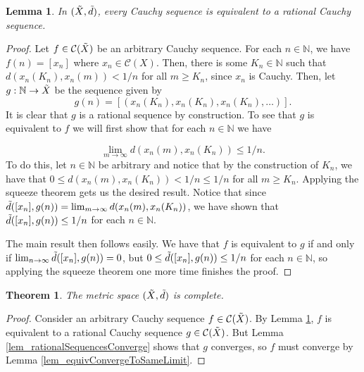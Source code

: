 \documentclass{article}
\newtheorem{theorem}{Theorem}[subsection]
\newtheorem{lemma}{Lemma}[subsection]
\theoremstyle{definition}
\theoremstyle{remark}
\newcommand{\N}{\mathbb{N}}
\newcommand{\prt}[1]{\mathcal{#1}}
\begin{document}
\begin{lemma} \label{lem_cauchySequenceEquivToRationalSequence}
    In $(\Tilde{X}, \Tilde{d})$, every Cauchy sequence is equivalent to a rational Cauchy sequence.
\end{lemma}

\begin{proof}
    Let $f \in \prt{C}(\Tilde{X})$ be an arbitrary Cauchy sequence.
    For each $n \in \N$, we have $f(n) = [x_n]$ where $x_n \in \prt{C}(X)$. Then, there is some $K_n \in \N$ such that $d(x_n(K_n), x_n(m)) < 1/n$ for all $m \geq K_n$, since $x_n$ is Cauchy. Then, let $g: \N \to \Tilde{X}$ be the sequence given by 
    \begin{equation*}
        g(n) = [(x_n(K_n), x_n(K_n), x_n(K_n), \dots)].
    \end{equation*} It is clear that $g$ is a rational sequence by construction. To see that $g$ is equivalent to $f$ we will first show that for each $n \in \N$ we have 
    
    \begin{equation*}
        \lim_{m \to \infty} d(x_n(m), x_n(K_n)) \leq 1/n.
    \end{equation*} To do this, let $n \in \N$ be arbitrary and notice that by the construction of $K_n$, we have that $0 \leq d(x_n(m), x_n(K_n)) < 1/n \leq 1/n$ for all $m \geq K_n$. Applying the squeeze theorem gets us the desired result. Notice that since $\Tilde{d}([x_n], g(n)) = \lim_{m \to \infty} d(x_n(m), x_n(K_n))$, we have shown that $\Tilde{d}([x_n], g(n)) \leq 1/n$ for each $n \in \N$.
    
    The main result then follows easily. We have that $f$ is equivalent to $g$ if and only if $\lim_{n \to \infty} \Tilde{d}([x_n], g(n)) = 0$, but $0 \leq \Tilde{d}([x_n], g(n))  \leq 1/n$ for each $n \in \N$, so applying the squeeze theorem one more time finishes the proof.
\end{proof}

\begin{theorem}
    The metric space $(\Tilde{X}, \Tilde{d})$ is complete.
\end{theorem}

\begin{proof}
    Consider an arbitrary Cauchy sequence $f \in \prt{C}(\Tilde{X})$. By Lemma \ref{lem_cauchySequenceEquivToRationalSequence}, $f$ is equivalent to a rational Cauchy sequence $g \in \prt{C}(\Tilde{X})$. But Lemma \ref{lem_rationalSequencesConverge} shows that $g$ converges, so $f$ must converge by Lemma \ref{lem_equivConvergeToSameLimit}.
\end{proof}
\end{document}
